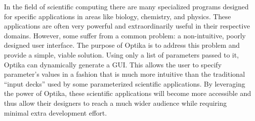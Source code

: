 In the field of scientific computing there are many specialized programs designed for specific applications 
in areas like biology, chemistry, and physics. These applications are often very powerful and extraordinarily 
useful in their respective domains. However, some suffer from a common problem: a non-intuitive, poorly designed user interface. 
The purpose of Optika is to address this problem and provide a simple, viable solution. Using
only a list of parameters passed to it, Optika can dynamically generate a GUI. This allows the user to specify 
parameter's values in a fashion that is much more intuitive than the traditional ``input decks'' used by some 
parameterized scientific applications. By leveraging the power of Optika, these scientific applications 
will become more accessible and thus allow their designers to reach a much wider audience while requiring 
minimal extra development effort.
